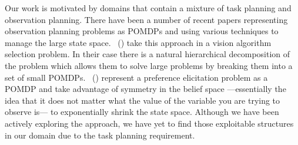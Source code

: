 Our work is motivated by domains that contain a mixture of task
planning and observation planning. There have been a number of recent
papers representing observation planning problems as POMDPs and using
various techniques to manage the large state
space. \citeauthor{hippo-jnl}~(\citeyear{hippo-jnl}) take this
approach in a vision algorithm selection problem. In their case there
is a natural hierarchical decomposition of the problem which allows
them to solve large problems by breaking them into a set of small
POMDPs. \citeauthor{doshi08:pref_elic}~(\citeyear{doshi08:pref_elic})
represent a preference elicitation problem as a POMDP and take
advantage of symmetry in the belief space ---essentially the idea that
it does not matter what the value of the variable you are trying to
observe is--- to exponentially shrink the state space. Although we
have been actively exploring the \citeauthor{doshi08:pref_elic}
approach, we have yet to find those exploitable structures in our
domain due to the task planning requirement.
